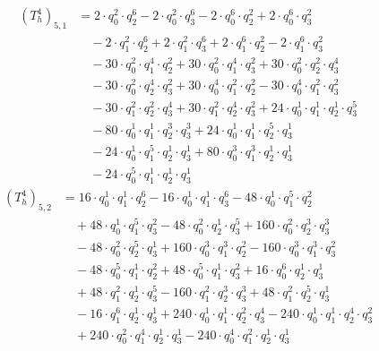 \begin{align*}(T_{h}^4)_{5,1}&=2\cdot q_0^{2}\cdot q_2^{6}-2\cdot q_0^{2}\cdot q_3^{6}-2\cdot q_0^{6}\cdot q_2^{2}+2\cdot q_0^{6}\cdot q_3^{2}\\
&\quad -2\cdot q_1^{2}\cdot q_2^{6}+2\cdot q_1^{2}\cdot q_3^{6}+2\cdot q_1^{6}\cdot q_2^{2}-2\cdot q_1^{6}\cdot q_3^{2}\\
&\quad -30\cdot q_0^{2}\cdot q_1^{4}\cdot q_2^{2}+30\cdot q_0^{2}\cdot q_1^{4}\cdot q_3^{2}+30\cdot q_0^{2}\cdot q_2^{2}\cdot q_3^{4}\\
&\quad -30\cdot q_0^{2}\cdot q_2^{4}\cdot q_3^{2}+30\cdot q_0^{4}\cdot q_1^{2}\cdot q_2^{2}-30\cdot q_0^{4}\cdot q_1^{2}\cdot q_3^{2}\\
&\quad -30\cdot q_1^{2}\cdot q_2^{2}\cdot q_3^{4}+30\cdot q_1^{2}\cdot q_2^{4}\cdot q_3^{2}+24\cdot q_0^{1}\cdot q_1^{1}\cdot q_2^{1}\cdot q_3^{5}\\
&\quad -80\cdot q_0^{1}\cdot q_1^{1}\cdot q_2^{3}\cdot q_3^{3}+24\cdot q_0^{1}\cdot q_1^{1}\cdot q_2^{5}\cdot q_3^{1}\\
&\quad -24\cdot q_0^{1}\cdot q_1^{5}\cdot q_2^{1}\cdot q_3^{1}+80\cdot q_0^{3}\cdot q_1^{3}\cdot q_2^{1}\cdot q_3^{1}\\
&\quad -24\cdot q_0^{5}\cdot q_1^{1}\cdot q_2^{1}\cdot q_3^{1}\end{align*}
\begin{align*}(T_{h}^4)_{5,2}&=16\cdot q_0^{1}\cdot q_1^{1}\cdot q_2^{6}-16\cdot q_0^{1}\cdot q_1^{1}\cdot q_3^{6}-48\cdot q_0^{1}\cdot q_1^{5}\cdot q_2^{2}\\
&\quad +48\cdot q_0^{1}\cdot q_1^{5}\cdot q_3^{2}-48\cdot q_0^{2}\cdot q_2^{1}\cdot q_3^{5}+160\cdot q_0^{2}\cdot q_2^{3}\cdot q_3^{3}\\
&\quad -48\cdot q_0^{2}\cdot q_2^{5}\cdot q_3^{1}+160\cdot q_0^{3}\cdot q_1^{3}\cdot q_2^{2}-160\cdot q_0^{3}\cdot q_1^{3}\cdot q_3^{2}\\
&\quad -48\cdot q_0^{5}\cdot q_1^{1}\cdot q_2^{2}+48\cdot q_0^{5}\cdot q_1^{1}\cdot q_3^{2}+16\cdot q_0^{6}\cdot q_2^{1}\cdot q_3^{1}\\
&\quad +48\cdot q_1^{2}\cdot q_2^{1}\cdot q_3^{5}-160\cdot q_1^{2}\cdot q_2^{3}\cdot q_3^{3}+48\cdot q_1^{2}\cdot q_2^{5}\cdot q_3^{1}\\
&\quad -16\cdot q_1^{6}\cdot q_2^{1}\cdot q_3^{1}+240\cdot q_0^{1}\cdot q_1^{1}\cdot q_2^{2}\cdot q_3^{4}-240\cdot q_0^{1}\cdot q_1^{1}\cdot q_2^{4}\cdot q_3^{2}\\
&\quad +240\cdot q_0^{2}\cdot q_1^{4}\cdot q_2^{1}\cdot q_3^{1}-240\cdot q_0^{4}\cdot q_1^{2}\cdot q_2^{1}\cdot q_3^{1}\end{align*}
